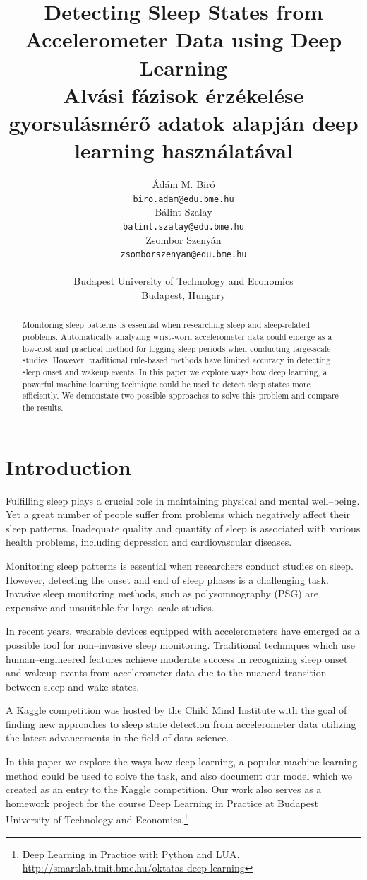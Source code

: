 \documentclass{article}
\title{
  Detecting Sleep States from Accelerometer Data using Deep Learning\\[1ex]
  Alvási fázisok érzékelése gyorsulásmérő adatok alapján deep learning használatával
}
\author{%
  Ádám M. Biró \\
  \texttt{biro.adam@edu.bme.hu} \\
  \And
  Bálint Szalay \\
  \texttt{balint.szalay@edu.bme.hu} \\
  \And
  Zsombor Szenyán \\
  \texttt{zsomborszenyan@edu.bme.hu} \\
  \AND
  \\
  Budapest University of Technology and Economics\\
  Budapest, Hungary \\
}
\begin{document}
\maketitle

\begin{abstract}
  Monitoring sleep patterns is essential when researching sleep and sleep-related problems. Automatically analyzing wrist-worn accelerometer data could emerge as a low-cost and practical method for logging sleep periods when conducting large-scale studies. However, traditional rule-based methods have limited accuracy in detecting sleep onset and wakeup events. In this paper we explore ways how deep learning, a powerful machine learning technique could be used to detect sleep states more efficiently. We demonstate two possible approaches to solve this problem and compare the results.\\[2ex]
\end{abstract}

\section{Introduction}

Fulfilling sleep plays a crucial role in maintaining physical and mental well–being. Yet a great number of people suffer from problems which negatively affect their sleep patterns. Inadequate quality and quantity of sleep is associated with various health problems, including depression and cardiovascular diseases.

Monitoring sleep patterns is essential when researchers conduct studies on sleep. However, detecting the onset and end of sleep phases is a challenging task. Invasive sleep monitoring methods, such as polysomnography (PSG) are expensive and unsuitable for large–scale studies.

In recent years, wearable devices equipped with accelerometers have emerged as a possible tool for non–invasive sleep monitoring. Traditional techniques which use human–engineered features achieve moderate success in recognizing sleep onset and wakeup events from accelerometer data due to the nuanced transition between sleep and wake states.

A Kaggle competition was hosted by the Child Mind Institute \cite{child-mind-institute-detect-sleep-states} with the goal of finding new approaches to sleep state detection from accelerometer data utilizing the latest advancements in the field of data science.

In this paper we explore the ways how deep learning, a popular machine learning method could be used to solve the task, and also document our model which we created as an entry to the Kaggle competition. Our work also serves as a homework project for the course Deep Learning in Practice at Budapest University of Technology and Economics.\footnote{Deep Learning in Practice with Python and LUA. \url{http://smartlab.tmit.bme.hu/oktatas-deep-learning}}
\end{document}
